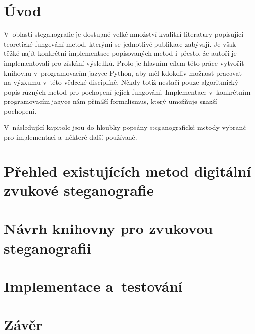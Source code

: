 \chapter{Úvod}
\label{cha:introduction}


V~oblasti steganografie je dostupné velké množství kvalitní literatury
popisující teoretické fungování metod, kterými se jednotlivé publikace
zabývají. Je však těžké najít konkrétní implementace popisovaných metod
i~přesto, že autoři je implementovali pro získání výsledků. Proto je hlavním
cílem této práce vytvořit knihovnu v~programovacím jazyce Python, aby měl
kdokoliv možnost pracovat na výzkumu v~této vědecké disciplíně. Někdy totiž
nestačí pouze algoritmický popis různých metod pro pochopení jejich fungování.
Implementace v~konkrétním programovacím jazyce nám přináší formalismus, který
umožňuje snazší pochopení.

V~následující kapitole  jsou do hloubky popsány steganografické metody vybrané pro
implementaci a~některé další používané.

\chapter{Přehled existujících metod digitální zvukové steganografie}
\label{cha:summary}



\chapter{Návrh knihovny pro zvukovou steganografii}
\label{cha:design}



\chapter{Implementace a~testování}
\label{cha:implementation}



\chapter{Závěr}
\label{cha:conclusion}
